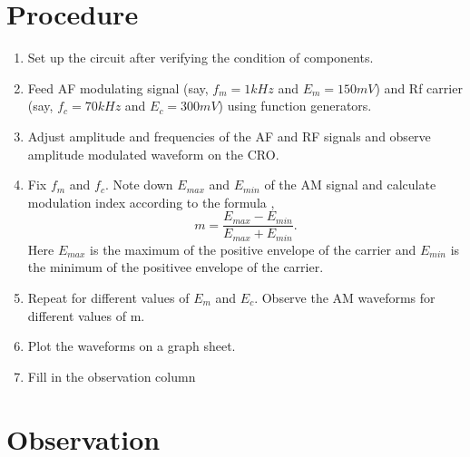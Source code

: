 \documentclass{book}
\begin{document}
\section*{Procedure}
\begin{enumerate}
\item
Set up the circuit after verifying the condition of components.
\item
Feed AF modulating signal (say, $f_m=1kHz$ and $E_m=150mV$) and Rf carrier (say, $f_c=70kHz$ and $E_c=300mV$) using function generators.
\item
Adjust amplitude and frequencies of the AF and RF signals and observe amplitude modulated waveform on the CRO.
\item
Fix $f_m$ and $f_c$. Note down $E_{max}$ and $E_{min}$ of the AM signal and calculate modulation index according to the formula ,
\begin{equation}
m=\frac{E_{max}-E_{min}}{E_{max}+E_{min}}.
\end{equation}
Here $E_{max}$ is the maximum of the positive envelope of the carrier and $E_{min}$ is the minimum of the positivee envelope of the carrier.
\item
Repeat for different values of $E_m$ and $E_c$. Observe the AM waveforms for different values of m.
\item
Plot the waveforms on a graph sheet.
\item

Fill in the observation column
\end{enumerate}


\section*{Observation}
\end{document}
